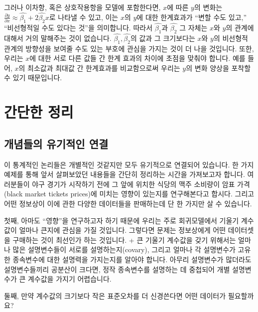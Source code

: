\documentclass[
]{book}
\begin{document}
그러나 이차항, 혹은 상호작용항을 모델에 포함한다면, \(x\)에 따른 \(y\)의 변화는 \(\frac{\partial y}{\partial x} \approx \hat{\beta_1} + 2\hat{\beta_2}x\)로 나타낼 수 있고, 이는 \(x\)의 \(y\)에 대한 한계효과가 ``변할 수도 있고,'' ``비선형적일 수도 있다는 것''을 의미합니다. 따라서 \(\hat{\beta_1}\)과 \(\hat{\beta_2}\) 그 자체는 \(x\)와 \(y\)의 관계에 대해서 거의 말해주는 것이 없습니다. \(\hat{\beta_1}, \hat{\beta_2}\)의 값과 그 크기보다는 \(x\)와 \(y\)의 비선형적 관계의 방향성을 보여줄 수도 있는 부호에 관심을 가지는 것이 더 나을 것입니다. 또한, 우리는 \(x\)에 대한 서로 다른 값들 간 한계 효과의 차이에 초점을 맞춰야 합니다. 예를 들어, \(x\)의 최소값과 최대값 간 한계효과를 비교함으로써 우리는 \(y\)의 변화 양상을 포착할 수 있기 때문입니다.

\hypertarget{uxac04uxb2e8uxd55c-uxc815uxb9ac}{%
\section{간단한 정리}\label{uxac04uxb2e8uxd55c-uxc815uxb9ac}}

\hypertarget{uxac1cuxb150uxb4e4uxc758-uxc720uxae30uxc801uxc778-uxc5f0uxacb0}{%
\subsection{개념들의 유기적인 연결}\label{uxac1cuxb150uxb4e4uxc758-uxc720uxae30uxc801uxc778-uxc5f0uxacb0}}

이 통계적인 논리들은 개별적인 것같지만 모두 유기적으로 연결되어 있습니다. 한 가지 예제를 통해 앞서 살펴보았던 내용들을 간단히 정리하는 시간을 가져보고자 합니다. 여러분들이 야구 경기가 시작하기 전에 그 앞에 위치한 식당의 맥주 소비량이 암표 가격(black market tickets prices)에 미치는 영향이 있는지를 연구해본다고 합시다. 그리고 어떤 정보상이 이에 관한 다양한 데이터들을 판매하는데 단 한 가지만 살 수 있습니다.

첫째, 아마도 ``영향''을 연구하고자 하기 때문에 우리는 주로 회귀모델에서 기울기 계수값이 얼마나 큰지에 관심을 가질 것입니다. 그렇다면 문제는 정보상에게 어떤 데이터셋을 구매하는 것이 최선인가 하는 것입니다.
+ 큰 기울기 계수값을 갖기 위해서는 얼마나 많은 설명변수들이 서로를 설명하는지(covary), 그리고 얼마나 각 설명변수가 고유한 종속변수에 대한 설명력을 가지는지를 알아야 합니다. 아무리 설명변수가 많더라도 설명변수들끼리 공분산이 크다면, 정작 종속변수를 설명하는 데 중첩되어 개별 설명변수가 큰 계수값을 가지기 어렵습니다.

둘째, 만약 계수값의 크기보다 작은 표준오차를 더 신경쓴다면 어떤 데이터가 필요할까요?
\end{document}
